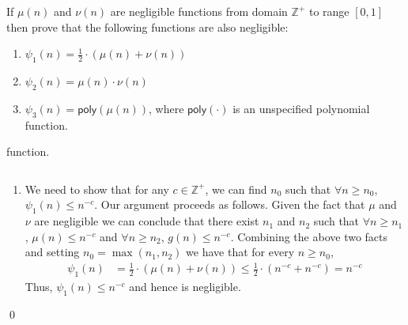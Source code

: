 \begin{exercise}
If $\mu(n)$ and $\nu(n)$ are negligible functions from domain $\mathbb{Z}^+$ to range $[0,1]$ then prove that the following functions are also negligible:
\begin{enumerate}
    \item $\psi_1(n) = \frac{1}{2} \cdot \left(\mu(n) + \nu(n)\right)$
    \item $\psi_2(n) = \mu(n)\cdot \nu(n)$
    \item $\psi_3(n) = \mathsf{poly}(\mu(n))$, where $\mathsf{poly}(\cdot)$ is an unspecified polynomial function.
\end{enumerate}function.
\end{exercise}
\proof 
$ $
\begin{enumerate}
    \item We need to show that for any $c \in \mathbb{Z}^+$, we can find $n_0$ such that $\forall n \geq n_0$, $\psi_1(n) \leq n^{-c}$. Our argument proceeds as follows. Given the fact that $\mu$ and $\nu$ are negligible we can conclude that there exist $n_1$ and $n_2$ such that $\forall n \geq n_1$, $\mu(n) \leq n^{-c}$ and $\forall n \geq n_2$, $g(n) \leq n^{-c}$. Combining the above two facts and setting $n_0 = \max(n_1, n_2)$ we have that for every $n \geq n_0$,
    \begin{align*}
        \psi_1(n) &= \frac{1}{2} \cdot (\mu(n) + \nu(n)) \leq \frac{1}{2} \cdot (n^{-c} + n^{-c}) = n^{-c}
    \end{align*}
    Thus, $\psi_1(n) \leq n^{-c}$ and hence is negligible.
\end{enumerate}
\qed

%


